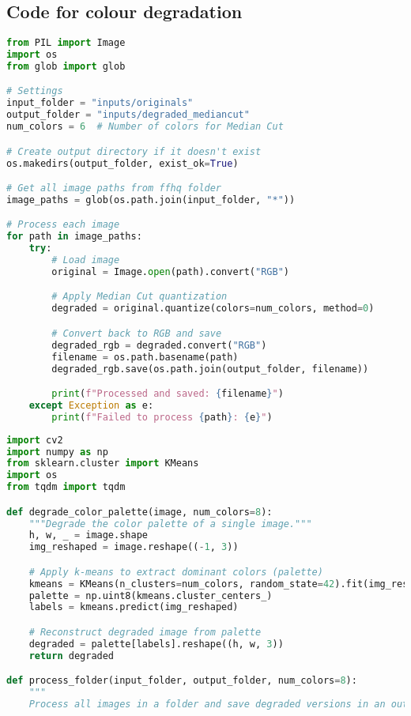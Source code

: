 \begin{sloppypar}
\subsection*{Code for colour degradation}

\begin{lstlisting}[language=Python]
from PIL import Image
import os
from glob import glob

# Settings
input_folder = "inputs/originals"
output_folder = "inputs/degraded_mediancut"
num_colors = 6  # Number of colors for Median Cut

# Create output directory if it doesn't exist
os.makedirs(output_folder, exist_ok=True)

# Get all image paths from ffhq folder
image_paths = glob(os.path.join(input_folder, "*"))

# Process each image
for path in image_paths:
    try:
        # Load image
        original = Image.open(path).convert("RGB")

        # Apply Median Cut quantization
        degraded = original.quantize(colors=num_colors, method=0)

        # Convert back to RGB and save
        degraded_rgb = degraded.convert("RGB")
        filename = os.path.basename(path)
        degraded_rgb.save(os.path.join(output_folder, filename))

        print(f"Processed and saved: {filename}")
    except Exception as e:
        print(f"Failed to process {path}: {e}")
\end{lstlisting}
\begin{lstlisting}[language=Python]
import cv2
import numpy as np
from sklearn.cluster import KMeans
import os
from tqdm import tqdm

def degrade_color_palette(image, num_colors=8):
    """Degrade the color palette of a single image."""
    h, w, _ = image.shape
    img_reshaped = image.reshape((-1, 3))

    # Apply k-means to extract dominant colors (palette)
    kmeans = KMeans(n_clusters=num_colors, random_state=42).fit(img_reshaped)
    palette = np.uint8(kmeans.cluster_centers_)
    labels = kmeans.predict(img_reshaped)

    # Reconstruct degraded image from palette
    degraded = palette[labels].reshape((h, w, 3))
    return degraded

def process_folder(input_folder, output_folder, num_colors=8):
    """
    Process all images in a folder and save degraded versions in an output folder.


\end{lstlisting}
\end{sloppypar}
